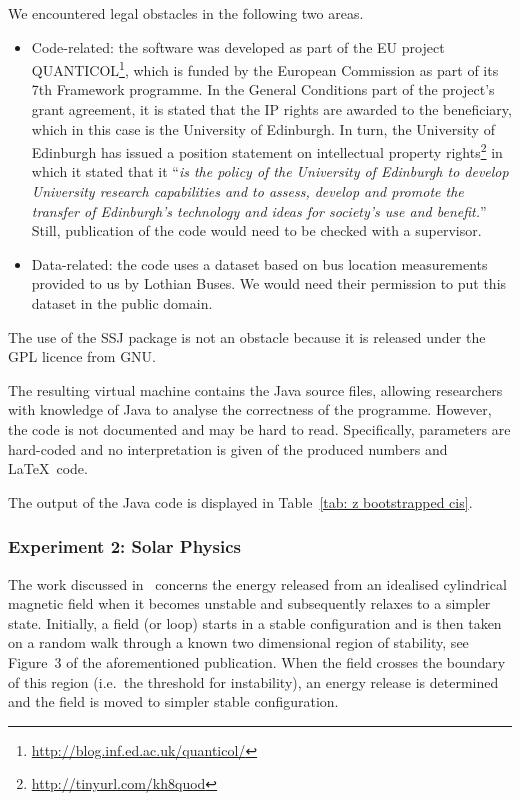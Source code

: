 We encountered legal obstacles in the following two areas.
\begin{itemize} 
\item Code-related: the software was developed as part of the EU project
QUANTICOL\footnote{\url{http://blog.inf.ed.ac.uk/quanticol/}}, which is funded by the European Commission as part of its 7th
Framework programme. In the General Conditions part of the project's grant
agreement, it is stated that the IP rights are awarded to the beneficiary, which
in this case is the University of Edinburgh. In turn, the University of
Edinburgh has issued a position statement on intellectual property
rights\footnote{\url{http://tinyurl.com/kh8quod}} in which it stated that it ``\emph{is the policy of the University of Edinburgh to develop University research capabilities and to assess, develop and promote the transfer of Edinburgh's technology and ideas for society's use and benefit.}'' Still, publication of the code would need to be checked with a supervisor.
\item Data-related: the code uses a dataset based on bus location measurements provided to us by Lothian Buses. We would need their permission to put this dataset in the public domain.
\end{itemize}
The use of the SSJ package is not an obstacle because it is released under the GPL licence from GNU.

The resulting virtual machine contains the Java source files, allowing
researchers with knowledge of Java to analyse the correctness of the programme.
However, the code is not documented and may be hard to read. Specifically,
parameters are hard-coded and no interpretation is given of the produced
numbers and \LaTeX\ code.

The output of the Java code is displayed in Table~\ref{tab: z bootstrapped cis}.



\subsubsection*{Experiment 2: Solar Physics}


The work discussed in~\cite{bareford2010nanoflare} concerns the energy released
from an idealised cylindrical magnetic field when it becomes unstable and
subsequently relaxes to a simpler state. Initially, a field (or loop) starts in
a stable configuration and is then taken on a random walk through a known two
dimensional region of stability, see \mbox{Figure 3} of the aforementioned
publication. When the field crosses the boundary of this region (i.e.\ the threshold for instability), an energy release is determined and the field is moved to simpler stable configuration. 

